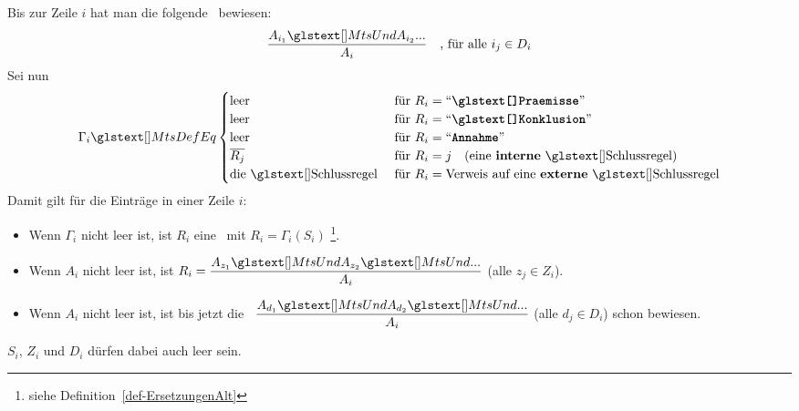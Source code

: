 {Bis zur Zeile $i$ hat man die folgende \Schlussregel\ bewiesen:
\[ \frac{A_{i_1} \MtsUnd A_{i_2} ...}{A_i} \quad \text{, für alle } i_j \in D_i \]
Sei nun
\[
	\Gamma_i \MtsDefEq
	\begin{cases}
		\text{leer}    & \text{ für } R_i = \text{\strqt{\Praemisse}} \\
		\text{leer}    & \text{ für } R_i = \text{\strqt{\Konklusion}}     \\
		\text{leer}    & \text{ für } R_i = \text{\strqt{Annahme}}        \\
		\overline{R_j} & \text{ für } R_i = j \quad \text{(eine \defFt{interne} \Schlussregel)} \\
		\text{die \Schlussregel} & \text{ für } R_i = \text{Verweis auf eine \defFt{externe} \Schlussregel}
	\end{cases}
\]
Damit gilt für die Einträge in einer Zeile $i$:
\begin{itemize}
	\item Wenn $\Gamma_i$ nicht leer ist, ist $R_i$ eine \Schlussregel\ mit $R_i = \Gamma_i(S_i)$%
	\footnote{%
		siehe Definition~\eqref{def-ErsetzungenAlt} 
	}.
	\item Wenn $A_i$ nicht leer ist, ist $R_i = \dfrac{A_{z_1} \MtsUnd A_{z_2} \MtsUnd ...}{A_i}$ (alle $z_j \in Z_i$).
	\item Wenn $A_i$ nicht leer ist, ist bis jetzt die \Schlussregel\ $\dfrac{A_{d_1} \MtsUnd A_{d_2} \MtsUnd ...}{A_i}$ (alle $d_j \in D_i$) schon bewiesen.
\end{itemize}
$S_i$, $Z_i$ und $D_i$ dürfen dabei auch leer sein.

}
